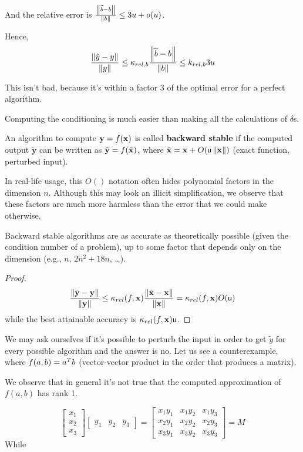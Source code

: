 \documentclass[ComputationalMathematics.tex]{subfiles}
\begin{document}
And the relative error is $\frac{\left\lVert\widetilde{b}-b\right\rVert}{\left\lVert b\right\rVert} \leq 3u + o(u)$.

Hence,
\[
  \frac{\left\lVert\tilde{y}-y\right\rVert}{\left\lVert y\right\rVert} \leq \kappa_{rel, b} \frac{\left\lVert\widetilde{b}-b\right\rVert}{\left\lVert b\right\rVert} \le k_{rel, b} 3u
\]

This isn't bad, because it's within a factor $3$ of the optimal error for a perfect algorithm.

Computing the conditioning is much easier than making all the calculations of $\delta$s.

\begin{definition}
  An algorithm to compute $\mathbf{y}=f(\mathbf{x})$ is called \textbf{backward stable} if the computed output $\tilde{\mathbf{y}}$ can be written as $\tilde{\mathbf{y}} = f(\tilde{\mathbf{x}})$, where $\tilde{\mathbf{x}} = \mathbf{x} + O(\mathsf{u} \left\lVert\mathbf{x}\right\rVert)$ (exact function, perturbed input).
\end{definition}

\begin{obs}
In real-life usage, this $O()$ notation often hides polynomial factors in the dimension $n$. Although this may look an illicit simplification, we observe that these factors are much more harmless than the error that we could make otherwise.
\end{obs}

\begin{theorem}
Backward stable algorithms are as accurate as theoretically possible (given the condition number of a problem), up to some factor that depends only on the dimension (e.g., $n$, $2n^2+18n$, \dots).
\end{theorem}

\begin{proof}
\[
\frac{\left\lVert\tilde{\mathbf{y}} - \mathbf{y}\right\rVert}{\left\lVert\mathbf{y}\right\rVert} \leq \kappa_{rel}(f,\mathbf{x})\frac{\left\lVert\tilde{\mathbf{x}}-\mathbf{x}\right\rVert}{\left\lVert\mathbf{x}\right\rVert} = \kappa_{rel}(f,\mathbf{x}) O(\mathsf{u})
\]
while the best attainable accuracy is $\kappa_{rel}(f,\mathbf{x})\mathsf{u}$.
\end{proof}


We may ask ourselves if it's possible to perturb the input in order to get $\widetilde{y}$ for every possible algorithm and the answer is no. Let us see a counterexample, where $f(a, b) = {a}^{T} b$ (vector-vector product in the order that produces a matrix).

We observe that in general it's not true that the computed approximation of $f(a, b)$ has rank 1.

\[
\begin{bmatrix}
    x_1\\ x_2\\ x_3
\end{bmatrix}
\begin{bmatrix}
    y_1 & y_2 & y_3
\end{bmatrix}
=
\begin{bmatrix}
    x_1 y_1 & x_1 y_2 & x_1 y_3\\
    x_2 y_1 & x_2 y_2 & x_2 y_3\\
    x_3 y_1 & x_3 y_2 & x_3 y_3
\end{bmatrix}
=
M
\]
While
\end{document}
